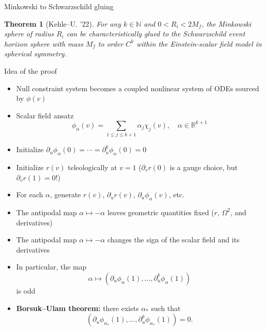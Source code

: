 \documentclass[compress,usenames,dvipsnames,8pt]{beamer}
\newtheorem*{thm}{Theorem}
\theoremstyle{definition}
\renewcommand{\(}{\begin{columns}}
\renewcommand{\)}{\end{columns}}
\newcommand{\<}[1]{\begin{column}{#1}}
\renewcommand{\>}{\end{column}}
\begin{document}
\begin{frame}{Minkowski to Schwarzschild gluing}
\begin{thm}[Kehle--U. '22]
For any $k\in \mathbb N$ and $0<R_i<2M_f$, the Minkowski sphere of radius $R_i$ can be characteristically glued to the Schwarzschild event horizon sphere with mass $M_f$ to order $C^k$ within the Einstein-scalar field model in spherical symmetry. 
\end{thm}

\begin{figure}
 \def\svgwidth{14pc}

\end{figure}

\end{frame}

\begin{frame}{Idea of the proof}
\begin{itemize}
\item Null constraint system becomes a coupled nonlinear system of ODEs sourced by $\phi(v)$ \pause

\item Scalar field ansatz \[\phi_\alpha(v) = \sum_{1\le j\le k+1}\alpha_j \chi_j(v),\quad \alpha\in \mathbb R^{k+1}\] \pause

\item Initialize $\partial_u \phi_\alpha(0)=\cdots = \partial_u^k\phi_\alpha(0)=0$ \pause

\item Initialize $r(v)$ teleologically at $v=1$ ($\partial_v r(0)$ is a gauge choice, but $\partial_v r(1)=0$!) \pause

\item For each $\alpha$, generate $r(v)$, $\partial_u r(v)$, $\partial_u\phi_\alpha(v)$, etc. \pause

\item The antipodal map $\alpha\mapsto -\alpha$ leaves geometric quantities fixed ($r$, $\Omega^2$, and derivatives) \pause

\item The antipodal map $\alpha\mapsto -\alpha$ changes the sign of the scalar field and its derivatives \pause

\item In particular, the map 
\[\alpha\mapsto \left(\partial_u \phi_\alpha(1),\dotsc, \partial_u^k\phi_\alpha(1)\right)\] \pause
is odd

\item \textbf{Borsuk--Ulam theorem:} there exists $\alpha_*$ such that 
\[ \left(\partial_u \phi_{\alpha_*}(1),\dotsc, \partial_u^k\phi_{\alpha_*}(1)\right)=0.\]
\end{itemize}

\end{frame}
\end{document}
